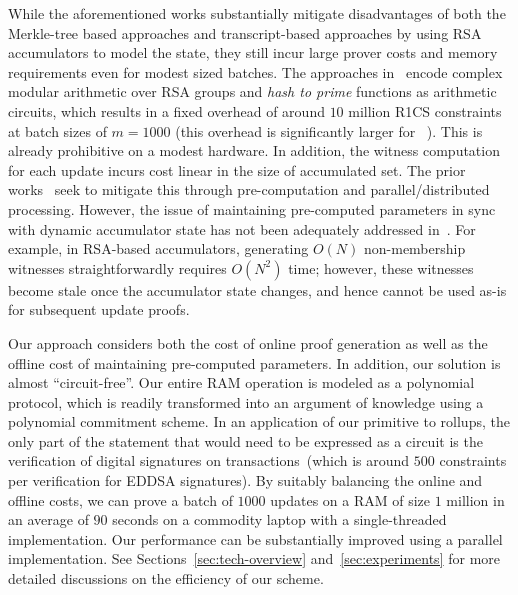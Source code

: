 While the aforementioned works substantially mitigate disadvantages of both the
Merkle-tree based approaches and transcript-based approaches by using RSA accumulators to model the state,
they still incur large prover costs and memory requirements even for modest sized batches. The approaches
in~\cite{USENIX:OWWB20,CCS:CFHKKO22} encode complex modular arithmetic over RSA groups and {\em hash
to prime} functions as arithmetic circuits, which results in a fixed overhead of around $10$ million R1CS constraints
at batch sizes of $m=1000$ (this overhead is significantly larger for ~\cite{USENIX:OWWB20}). This is already prohibitive on a modest hardware. In addition, the witness computation for each update incurs cost
linear in the size of accumulated set. The prior works~\cite{USENIX:OWWB20,CCS:CFHKKO22} seek to mitigate this through pre-computation and
parallel/distributed processing. However, the issue of maintaining pre-computed parameters in sync with dynamic accumulator state has not been adequately addressed in~\cite{USENIX:OWWB20,CCS:CFHKKO22}. For example, in RSA-based accumulators, generating $O(N)$ non-membership witnesses straightforwardly requires $O(N^2)$ time; however, these witnesses become stale once the accumulator state changes, and hence cannot be used as-is for subsequent update proofs. 

Our approach considers both the cost of online proof generation as well as the offline cost of maintaining pre-computed parameters. In addition, our solution is almost ``circuit-free''. Our entire RAM operation is modeled as a polynomial protocol, which is readily transformed into an argument of
knowledge using a polynomial commitment scheme. In an application of our primitive to rollups, the only part of the statement 
that would need to be expressed as a circuit is the verification of digital signatures on transactions~(which is around $500$ constraints per verification for EDDSA signatures). By suitably balancing the online and offline costs, we can prove a batch of $1000$ updates on a RAM of size $1$ million in an average of $90$ seconds on a commodity laptop with a single-threaded implementation. Our performance can be substantially improved using a parallel implementation. See Sections~\ref{sec:tech-overview} and~\ref{sec:experiments}  for more detailed discussions on the efficiency of our scheme. 



